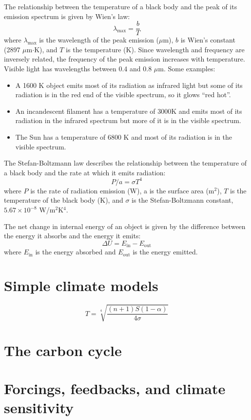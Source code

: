 \documentclass[11pt]{article}
\begin{document}
The relationship between the temperature of a black body and the peak of its emission spectrum is
given by Wien's law:
\[
\lambda_{\text{max}} = \frac{b}{T}
\]
where $\lambda_{\text{max}}$ is the wavelength of the peak emission ($\mu$m), $b$ is Wien's constant (2897 $\mu$m$\cdot$K),
and $T$ is the temperature (K). Since wavelength and frequency are inversely related, the frequency of the peak emission
increases with temperature. Visible light has wavelengths between 0.4 and 0.8 $\mu$m.
Some examples:
\begin{itemize}
    \item A 1600 K object emits most of its radiation as infrared light but some of its radiation is in the red end of the visible spectrum,
        so it glows ``red hot''.
    \item An incandescent filament has a temperature of 3000K and emits most of its radiation in the infrared spectrum but more of it is in the visible spectrum.
    \item The Sun has a temperature of 6800 K and most of its radiation is in the visible spectrum.
\end{itemize}

The Stefan-Boltzmann law describes the relationship between the temperature of a black body
and the rate at which it emits radiation:
\[
P/a = \sigma T^4
\]
where $P$ is the rate of radiation emission (W), a is the surface area (m$^2$), $T$ is the temperature of the black body (K),
and $\sigma$ is the Stefan-Boltzmann constant, $5.67 \times 10^{-8}$ W/m$^2$K$^4$.

The net change in internal energy of an object is given by the difference between the energy it absorbs and the energy it emits:
\[
\Delta U = E_{\text{in}} - E_{\text{out}}
\]
where $E_{\text{in}}$ is the energy absorbed and $E_{\text{out}}$ is the energy emitted.



\section{Simple climate models}
\[
T = \sqrt[4]{\frac{(n+1)S(1-\alpha)}{4 \sigma}}
\]



\section{The carbon cycle}
\section{Forcings, feedbacks, and climate sensitivity}
\end{document}
